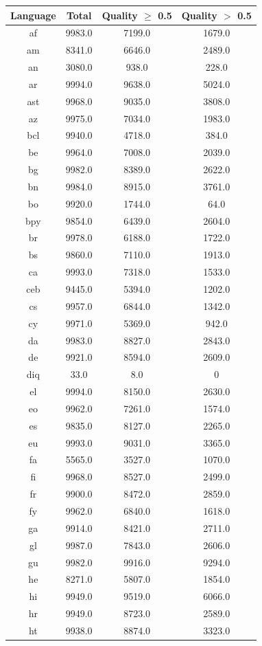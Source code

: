 \documentclass[11pt]{article}
\begin{document}
\begin{figure}[h]
\centering
\begin{tabular}{cccc}
Language&Total&Quality $\geq$ 0.5& Quality $>$ 0.5\\\hline\hline
af&9983.0&7199.0&1679.0\\
am&8341.0&6646.0&2489.0\\
an&3080.0&938.0&228.0\\
ar&9994.0&9638.0&5024.0\\
ast&9968.0&9035.0&3808.0\\
az&9975.0&7034.0&1983.0\\
bcl&9940.0&4718.0&384.0\\
be&9964.0&7008.0&2039.0\\
bg&9982.0&8389.0&2622.0\\
bn&9984.0&8915.0&3761.0\\
bo&9920.0&1744.0&64.0\\
bpy&9854.0&6439.0&2604.0\\
br&9978.0&6188.0&1722.0\\
bs&9860.0&7110.0&1913.0\\
ca&9993.0&7318.0&1533.0\\
ceb&9445.0&5394.0&1202.0\\
cs&9957.0&6844.0&1342.0\\
cy&9971.0&5369.0&942.0\\
da&9983.0&8827.0&2843.0\\
de&9921.0&8594.0&2609.0\\
diq&33.0&8.0&0\\
el&9994.0&8150.0&2630.0\\
eo&9962.0&7261.0&1574.0\\
es&9835.0&8127.0&2265.0\\
eu&9993.0&9031.0&3365.0\\
fa&5565.0&3527.0&1070.0\\
fi&9968.0&8527.0&2499.0\\
fr&9900.0&8472.0&2859.0\\
fy&9962.0&6840.0&1618.0\\
ga&9914.0&8421.0&2711.0\\
gl&9987.0&7843.0&2606.0\\
gu&9982.0&9916.0&9294.0\\
he&8271.0&5807.0&1854.0\\
hi&9949.0&9519.0&6066.0\\
hr&9949.0&8723.0&2589.0\\
ht&9938.0&8874.0&3323.0\\

\end{tabular}
\end{figure}
\end{document}
